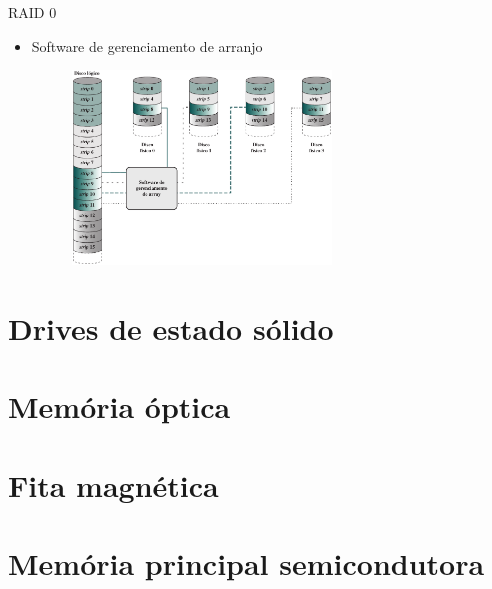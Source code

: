 \begin{slide}{RAID 0}
	\begin{itemize}
		\item Software de gerenciamento de arranjo
			\begin{figure}[h]
				\centering
				\includegraphics[width=0.65\textwidth]{figs/mapeamento}
			\end{figure}
	\end{itemize}
\end{slide}

\section[slide=true]{Drives de estado sólido}
\section[slide=true]{Memória óptica}
\section[slide=true]{Fita magnética}
\section[slide=true]{Memória principal semicondutora}

%
%
%
%

